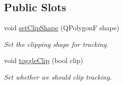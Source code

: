 \subsection*{Public Slots}
\begin{DoxyCompactItemize}
\item 
void \hyperlink{classKFBallTracker_aa875c61db5b740fe2d1a792377aa0933}{set\+Clip\+Shape} (Q\+PolygonF shape)\hypertarget{classKFBallTracker_aa875c61db5b740fe2d1a792377aa0933}{}\label{classKFBallTracker_aa875c61db5b740fe2d1a792377aa0933}

\begin{DoxyCompactList}\small\item\em Set the clipping shape for tracking. \end{DoxyCompactList}\item 
void \hyperlink{classKFBallTracker_a3f3dc75689789297abb0292fdd438fc3}{toggle\+Clip} (bool clip)\hypertarget{classKFBallTracker_a3f3dc75689789297abb0292fdd438fc3}{}\label{classKFBallTracker_a3f3dc75689789297abb0292fdd438fc3}

\begin{DoxyCompactList}\small\item\em Set whether we should clip tracking. \end{DoxyCompactList}\end{DoxyCompactItemize}
